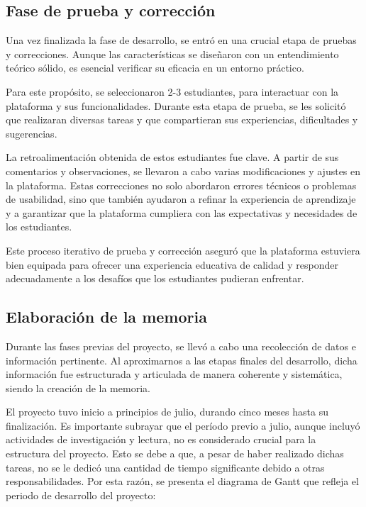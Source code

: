 \subsection{Fase de prueba y corrección}

Una vez finalizada la fase de desarrollo, se entró en una crucial etapa de pruebas y correcciones. Aunque las características se diseñaron con un entendimiento teórico sólido, es esencial verificar su eficacia en un entorno práctico.

Para este propósito, se seleccionaron 2-3 estudiantes, para interactuar con la plataforma y sus funcionalidades. Durante esta etapa de prueba, se les solicitó que realizaran diversas tareas y que compartieran sus experiencias, dificultades y sugerencias.

La retroalimentación obtenida de estos estudiantes fue clave. A partir de sus comentarios y observaciones, se llevaron a cabo varias modificaciones y ajustes en la plataforma. Estas correcciones no solo abordaron errores técnicos o problemas de usabilidad, sino que también ayudaron a refinar la experiencia de aprendizaje y a garantizar que la plataforma cumpliera con las expectativas y necesidades de los estudiantes.

Este proceso iterativo de prueba y corrección aseguró que la plataforma estuviera bien equipada para ofrecer una experiencia educativa de calidad y responder adecuadamente a los desafíos que los estudiantes pudieran enfrentar.

\subsection{Elaboración de la memoria}

Durante las fases previas del proyecto, se llevó a cabo una recolección de datos e información pertinente. Al aproximarnos a las etapas finales del desarrollo, dicha información fue estructurada y articulada de manera coherente y sistemática, siendo la creación de la memoria.

El proyecto tuvo inicio a principios de julio, durando cinco meses hasta su finalización. Es importante subrayar que el período previo a julio, aunque incluyó actividades de investigación y lectura, no es considerado crucial para la estructura del proyecto. Esto se debe a que, a pesar de haber realizado dichas tareas, no se le dedicó una cantidad de tiempo significante debido a otras responsabilidades. Por esta razón, se presenta el diagrama de Gantt que refleja el periodo de desarrollo del proyecto:


